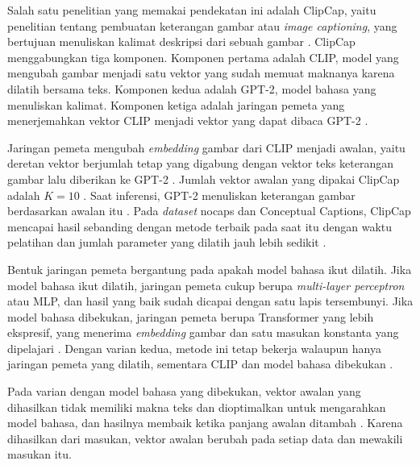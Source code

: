 Salah satu penelitian yang memakai pendekatan ini adalah ClipCap, yaitu penelitian tentang pembuatan keterangan gambar atau \textit{image captioning}, yang bertujuan menuliskan kalimat deskripsi dari sebuah gambar \parencite{mokady2021}.
ClipCap menggabungkan tiga komponen.
Komponen pertama adalah CLIP, model yang mengubah gambar menjadi satu vektor yang sudah memuat maknanya karena dilatih bersama teks.
Komponen kedua adalah GPT-2, model bahasa yang menuliskan kalimat.
Komponen ketiga adalah jaringan pemeta yang menerjemahkan vektor CLIP menjadi vektor yang dapat dibaca GPT-2 \parencite{mokady2021}.

Jaringan pemeta mengubah \textit{embedding} gambar dari CLIP menjadi awalan, yaitu deretan vektor berjumlah tetap yang digabung dengan vektor teks keterangan gambar lalu diberikan ke GPT-2 \parencite{mokady2021}.
Jumlah vektor awalan yang dipakai ClipCap adalah $K = 10$ \parencite{mokady2021}.
Saat inferensi, GPT-2 menuliskan keterangan gambar berdasarkan awalan itu \parencite{mokady2021}.
Pada \textit{dataset} nocaps dan Conceptual Captions, ClipCap mencapai hasil sebanding dengan metode terbaik pada saat itu dengan waktu pelatihan dan jumlah parameter yang dilatih jauh lebih sedikit \parencite{mokady2021}.

Bentuk jaringan pemeta bergantung pada apakah model bahasa ikut dilatih.
Jika model bahasa ikut dilatih, jaringan pemeta cukup berupa \textit{multi-layer perceptron} atau MLP, dan hasil yang baik sudah dicapai dengan satu lapis tersembunyi.
Jika model bahasa dibekukan, jaringan pemeta berupa Transformer yang lebih ekspresif, yang menerima \textit{embedding} gambar dan satu masukan konstanta yang dipelajari \parencite{mokady2021}.
Dengan varian kedua, metode ini tetap bekerja walaupun hanya jaringan pemeta yang dilatih, sementara CLIP dan model bahasa dibekukan \parencite{mokady2021}.

Pada varian dengan model bahasa yang dibekukan, vektor awalan yang dihasilkan tidak memiliki makna teks dan dioptimalkan untuk mengarahkan model bahasa, dan hasilnya membaik ketika panjang awalan ditambah \parencite{mokady2021}.
Karena dihasilkan dari masukan, vektor awalan berubah pada setiap data dan mewakili masukan itu.

